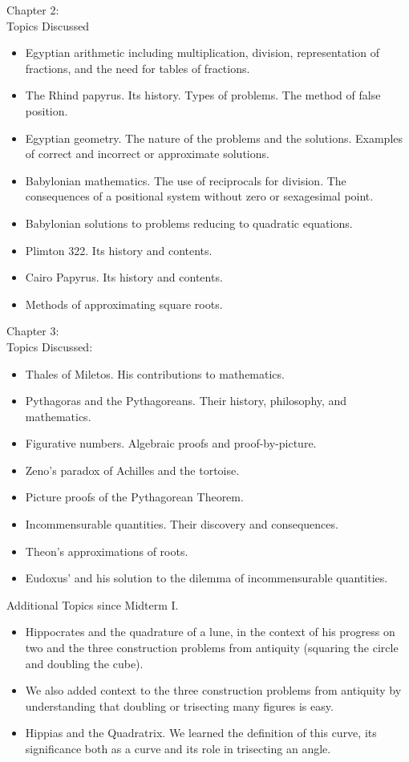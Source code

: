 \documentclass[11pt,fleqn]{article}
\begin{document}
Chapter 2: \\
Topics Discussed 
\begin{itemize}
\item Egyptian arithmetic including multiplication, division, representation of fractions, and the need for tables of fractions. 
\item The Rhind papyrus. Its history. Types of problems. The method of false position. 
\item Egyptian geometry. The nature of the problems and the solutions. Examples of correct and incorrect or approximate solutions.
\item Babylonian mathematics. The use of reciprocals for division. The consequences of a positional system without zero or sexagesimal point.
\item Babylonian solutions to problems reducing to quadratic equations.
\item Plimton 322. Its history and contents. 
\item Cairo Papyrus. Its history and contents. 
\item Methods of approximating square roots.\\
\end{itemize}

Chapter 3:\\
Topics Discussed:
\begin{itemize}
\item Thales of Miletos. His contributions to mathematics.
\item Pythagoras and the Pythagoreans. Their history, philosophy, and mathematics.
\item Figurative numbers. Algebraic proofs and proof-by-picture.
\item Zeno's paradox of Achilles and the tortoise.
\item Picture proofs of the Pythagorean Theorem. 
\item Incommensurable quantities. Their discovery and consequences.
\item Theon's approximations of roots.
\item Eudoxus' and his solution to the dilemma of incommensurable quantities.\\
\end{itemize}

Additional Topics since Midterm I.\\

\begin{itemize}
\item Hippocrates and the quadrature of a lune, in the context of his progress on two and the three construction problems from antiquity (squaring the circle and doubling the cube).
\item We also added context to the three construction problems from antiquity by understanding that doubling or trisecting many figures is easy.
\item Hippias and the Quadratrix. We learned the definition of this curve, its significance both as a curve and its role in trisecting an angle.
\end{itemize}
\end{document}
